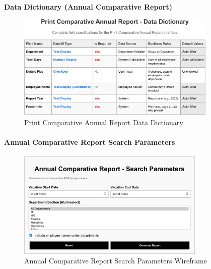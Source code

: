 \documentclass[12pt,a4paper]{article}
\begin{document}
\noindent\textbf{Data Dictionary (Annual Comparative Report)}
\begin{figure}[H]
\centering
\includegraphics[width=0.85\textwidth]{Data-Dictionary/Screen-Data-Dictionaries/Print-Comparative-Annual-Report-Data-Dictionary/Print-Comparative-Annual-Report-Data-Dictionary-1.png}
\caption{Print Comparative Annual Report Data Dictionary}
\label{fig:print-comparative-annual-data-dict-inline}
\end{figure}

\paragraph{Annual Comparative Report Search Parameters}
\begin{figure}[H]
\centering
\includegraphics[width=0.8\textwidth]{Wireframes/Annual-Comparative-Report-Search-Parameters/Annual-Comparative-Report-Search-Parameters-1.png}
\caption{Annual Comparative Report Search Parameters Wireframe}
\label{fig:wireframe-annual-comparative-report-search-params}
\end{figure}
\end{document}
